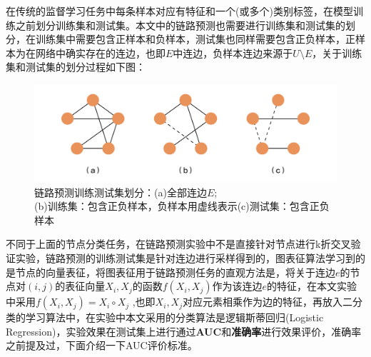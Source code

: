 在传统的监督学习任务中每条样本对应有特征和一个(或多个)类别标签，在模型训练之前划分训练集和测试集。本文中的链路预测也需要进行训练集和测试集的划分，在训练集中需要包含正样本和负样本，测试集也同样需要包含正负样本，正样本为在网络中确实存在的连边，也即$E$中连边，负样本连边来源于$U\setminus E$，关于训练集和测试集的划分过程如下图：
\begin{figure}
	\centering
	\includegraphics[width=5in]{figures/link_prediction_split}
	\caption{链路预测训练测试集划分：(a)全部连边$E$;\\(b)训练集：包含正负样本，负样本用虚线表示(c)测试集：包含正负样本}
\end{figure}

不同于上面的节点分类任务，在链路预测实验中不是直接针对节点进行k折交叉验证实验，链路预测的训练测试集是针对连边进行采样得到的，图表征算法学习到的是节点的向量表征，将图表征用于链路预测任务的直观方法是，将关于连边$e$的节点对$(i,j)$的表征向量$X_i,X_j$的函数$f(X_i, X_j)$作为该连边$e$的特征，在本文实验中采用$f(X_i, X_j) = X_i\circ X_j$ ,也即$X_i, X_j$对应元素相乘作为边的特征，再放入二分类的学习算法中，在实验中本文采用的分类算法是逻辑斯蒂回归(Logistic Regression)，实验效果在测试集上进行通过\textbf{AUC}和\textbf{准确率}进行效果评价，准确率之前提及过，下面介绍一下AUC评价标准。

